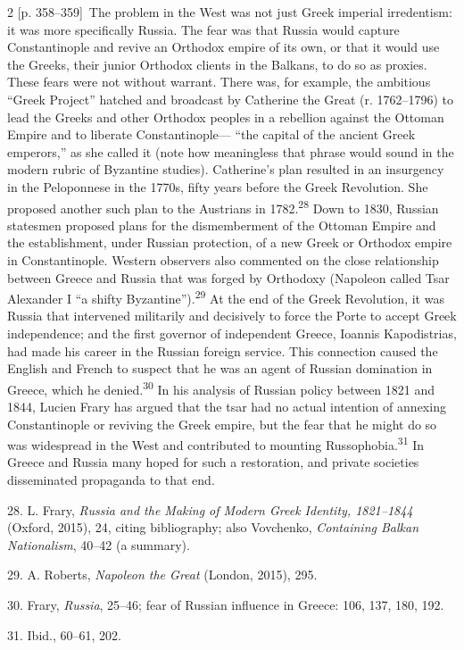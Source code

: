 \documentclass[10pt,a4paper]{article}
\begin{document}
\begin{paracol}{2}
{\scriptsize\color{gray}[p. 358–359]}\ The problem in the West was not just Greek imperial irredentism: it was more specifically Russia. The fear was that Russia would capture Constantinople and revive an Orthodox empire of its own, or that it would use the Greeks, their junior Orthodox clients in the Balkans, to do so as proxies. These fears were not without warrant. There was, for example, the ambitious “Greek Project” hatched and broadcast by Catherine the Great (r. 1762–1796) to lead the Greeks and other Orthodox peoples in a rebellion against the Ottoman Empire and to liberate Constantinople— “the capital of the ancient Greek emperors,” as she called it (note how meaningless that phrase would sound in the modern rubric of Byzantine studies). Catherine’s plan resulted in an insurgency in the Peloponnese in the 1770s, fifty years before the Greek Revolution. She proposed another such plan to the Austrians in 1782.\nobreak\textsuperscript{28} Down to 1830, Russian statesmen proposed plans for the dismemberment of the Ottoman Empire and the establishment, under Russian protection, of a new Greek or Orthodox empire in Constantinople. Western observers also commented on the close relationship between Greece and Russia that was forged by Orthodoxy (Napoleon called Tsar Alexander I “a shifty Byzantine”).\nobreak\textsuperscript{29} At the end of the Greek Revolution, it was Russia that intervened militarily and decisively to force the Porte to accept Greek independence; and the first governor of independent Greece, Ioannis Kapodistrias, had made his career in the Russian foreign service. This connection caused the English and French to suspect that he was an agent of Russian domination in Greece, which he denied.\nobreak\textsuperscript{30} In his analysis of Russian policy between 1821 and 1844, Lucien Frary has argued that the tsar had no actual intention of annexing Constantinople or reviving the Greek empire, but the fear that he might do so was widespread in the West and contributed to mounting Russophobia.\nobreak\textsuperscript{31} In Greece and Russia many hoped for such a restoration, and private societies disseminated propaganda to that end.\par{\small 28. L. Frary, \textit{Russia and the Making of Modern Greek Identity, 1821–1844} (Oxford, 2015), 24, citing bibliography; also Vovchenko, \textit{Containing Balkan Nationalism}, 40–42 (a summary).\par}{\small 29. A. Roberts, \textit{Napoleon the Great} (London, 2015), 295.\par}{\small 30. Frary, \textit{Russia}, 25–46; fear of Russian influence in Greece: 106, 137, 180, 192.\par}{\small 31.  Ibid., 60–61, 202.\par}

\end{paracol}
\end{document}
